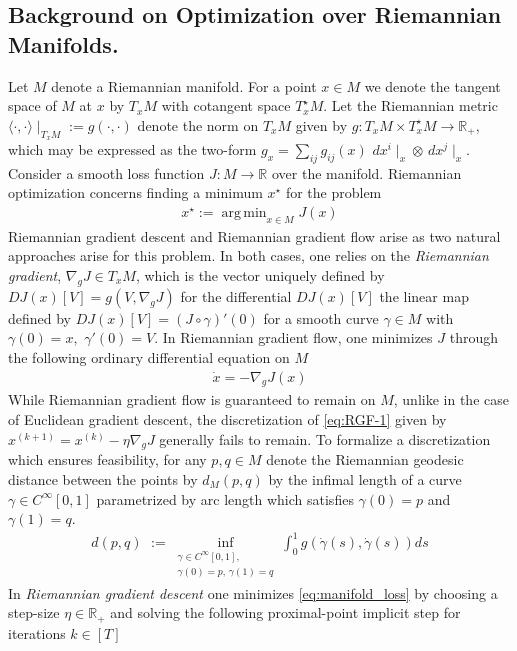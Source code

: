 \documentclass[reqno,11pt,letterpaper]{amsart}
\theoremstyle{plain}
\theoremstyle{definition}
\theoremstyle{remark}
\newcommand{\rgrad}{\nabla_{\!g}}
\DeclareMathOperator*{\argmin}{arg\,min}
\begin{document}
\subsection{Background on Optimization over Riemannian Manifolds.} Let $M$ denote a Riemannian manifold. For a point $x \in M$ we denote the tangent space of $M$ at $x$ by $T_{x} M$ with cotangent space $T_{x}^{\star} M$. Let the Riemannian metric $\langle \cdot, \cdot\rangle \mid_{T_{x}M} := g(\cdot,\cdot)$ denote the norm on $T_{x} M$ given by $g: T_{x} M \times T_{x}^{\star} M \to \mathbb{R}_{+}$, which may be expressed as the two-form $g_{x} = \sum_{ij} g_{ij}(x)\,\, dx^{i} \mid_{x} \otimes\, dx^{j} \mid_{x}$. Consider a smooth loss function $J: M \to \mathbb{R}$ over the manifold. Riemannian optimization concerns finding a minimum $x^{\star}$ for the problem
\begin{align}\label{eq:manifold_loss}
    x^{\star}:=\argmin_{x \in M} J(x)
\end{align}
Riemannian gradient descent and Riemannian gradient flow arise as two natural approaches arise for this problem. In both cases, one relies on the \emph{Riemannian gradient}, $ \rgrad J \in T_{x} M $, which is the vector uniquely defined by $D J(x) [V] = g( V, \rgrad J )$ for the differential $DJ (x) [V]$ the linear map defined by $DJ(x) [V] = (J \circ \gamma)'(0)$ for a smooth curve $\gamma \in M$ with $\gamma(0) = x, \,\, \gamma'(0) = V$. In Riemannian gradient flow, one minimizes $J$ through the following ordinary differential equation on $M$
\begin{align}
    \dot{x} = - \rgrad J (x) \label{eq:RGF-1}
\end{align}
While Riemannian gradient flow is guaranteed to remain on $M$, unlike in the case of Euclidean gradient descent, the discretization of \ref{eq:RGF-1} given by $x^{(k+1)} = x^{(k)} - \eta \rgrad J$ generally fails to remain. To formalize a discretization which ensures feasibility, for any $p,q \in M$ denote the Riemannian geodesic distance between the points by $d_{M}(p,q)$ by the infimal length of a curve $\gamma \in C^{\infty}[0,1]$ parametrized by arc length which satisfies $\gamma(0) = p$ and $\gamma(1) = q$.
\begin{align}
    d(p,q) \,\,:=\inf_{\substack{\gamma \in C^{\infty}[0,1], \\
     \gamma(0) = p, \,\gamma(1) = q}} \int_{0}^{1} g( \dot{\gamma}(s), \dot{\gamma}(s)) ds
\end{align}
In \emph{Riemannian gradient descent} one minimizes \ref{eq:manifold_loss} by choosing a step-size $\eta \in \mathbb{R}_{+}$ and solving the following proximal-point implicit step for iterations $k \in [T]$
\end{document}
